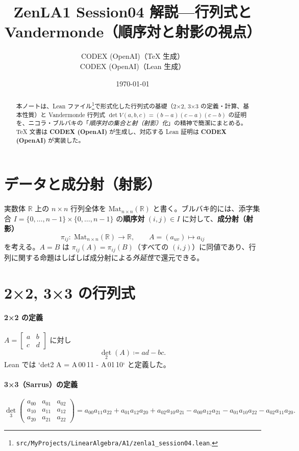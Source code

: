 \documentclass[luatexja,ja=standard,a4paper,12pt]{bxjsarticle}
\title{ZenLA1 Session04 解説\;—\;行列式と Vandermonde（順序対と射影の視点）}
\author{CODEX (OpenAI)（TeX 生成）\\ CODEX (OpenAI)（Lean 生成）}
\date{\today}
\newcommand{\R}{\mathbb{R}}
\newcommand{\Mat}{\mathrm{Mat}}
\theoremstyle{definition}
\theoremstyle{plain}
\theoremstyle{remark}
\begin{document}
\maketitle

\begin{abstract}
本ノートは、Lean ファイル\footnote{\texttt{src/MyProjects/LinearAlgebra/A1/zenla1\_session04.lean}.}で形式化した行列式の基礎（2×2, 3×3 の定義・計算、基本性質）と Vandermonde 行列式 $\det V(a,b,c)=(b-a)(c-a)(c-b)$ の証明を、ニコラ・ブルバキの「\emph{順序対の集合と射（射影）化}」の精神で簡潔にまとめる。TeX 文書は \textbf{CODEX (OpenAI)} が生成し、対応する Lean 証明は \textbf{CODEX (OpenAI)} が実装した。
\end{abstract}

\section{データと成分射（射影）}
実数体 $\R$ 上の $n\times n$ 行列全体を $\Mat_{n\times n}(\R)$ と書く。ブルバキ的には、添字集合 $I=\{0,\dots,n-1\}\times\{0,\dots,n-1\}$ の\textbf{順序対} $(i,j)\in I$ に対して、\textbf{成分射（射影）}
\[
  \pi_{ij}:\; \Mat_{n\times n}(\R) \longrightarrow \R,\qquad A=(a_{uv})\longmapsto a_{ij}
\]
を考える。$A=B$ は $\pi_{ij}(A)=\pi_{ij}(B)$（すべての $(i,j)$）に同値であり、行列に関する命題はしばしば成分射による\emph{外延性}で還元できる。

\begin{center}
\end{center}

\section{2×2, 3×3 の行列式}
\paragraph{2×2 の定義} $A=\begin{bmatrix}a&b\\c&d\end{bmatrix}$ に対し
\[
  \det_2(A) \coloneqq ad-bc.
\]
Lean では `det2 A = A\,00\,11 - A\,01\,10` と定義した。

\paragraph{3×3（Sarrus）の定義}
\[
  \det_3\!\begin{pmatrix}
  a_{00}&a_{01}&a_{02}\\ a_{10}&a_{11}&a_{12}\\ a_{20}&a_{21}&a_{22}
  \end{pmatrix}
  = a_{00}a_{11}a_{22}+a_{01}a_{12}a_{20}+a_{02}a_{10}a_{21}
   -a_{00}a_{12}a_{21}-a_{01}a_{10}a_{22}-a_{02}a_{11}a_{20}.
\]
\end{document}
